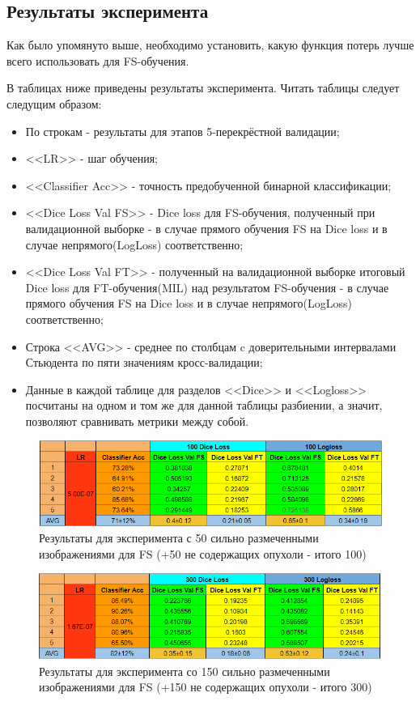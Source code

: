 \subsection{Результаты эксперимента}

Как было упомянуто выше, необходимо установить, какую функция потерь лучше всего использовать для FS-обучения. 

\noindent В таблицах ниже приведены результаты эксперимента. Читать таблицы следует следущим образом:

\begin{itemize}
    \item По строкам - результаты для этапов 5-перекрёстной валидации;
    \item <<LR>> - шаг обучения;
    \item <<Classifier Acc>> - точность предобученной бинарной классификации;
    \item <<Dice Loss Val FS>> - Dice loss для  FS-обучения, полученный при валидационной выборке - в случае прямого обучения FS на Dice loss и в случае непрямого(LogLoss) соответственно;
    \item <<Dice Loss Val FT>> -  полученный на валидационной выборке итоговый Dice loss для FT-обучения(MIL) над результатом FS-обучения - в случае прямого обучения FS на Dice loss и в случае непрямого(LogLoss) соответственно;
    \item Строка <<AVG>> - среднее по столбцам c доверительными интервалами Стьюдента по пяти значениям кросс-валидации;
    \item Данные в каждой таблице для разделов <<Dice>> и <<Logloss>> посчитаны на одном и том же для данной таблицы разбиении, а значит, позволяют сравнивать метрики между собой.
\end{itemize}

\begin{figure}[h!] 
  \center
  \includegraphics [scale=1.0] {images/experiment_100.png}
  \caption{ Результаты для эксперимента с 50 сильно размеченными изображениями для FS (+50 не содержащих опухоли - итого 100) } 
\end{figure}

\begin{figure}[h!] 
  \center
  \includegraphics [scale=1.0] {images/experiment_300.png}
  \caption{  Результаты для эксперимента со 150 сильно размеченными изображениями для FS (+150 не содержащих опухоли - итого 300) } 
\end{figure}

